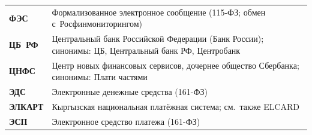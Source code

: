 \begin{longtable}{@{}p{4.5em}p{\dimexpr\linewidth-4.5em-2\tabcolsep\relax}@{}}
  \textbf{ФЭС}               & Формализованное электронное сообщение (115-ФЗ; обмен с~Росфинмониторингом)                                                                                                                                                                                                                       \\
  \textbf{ЦБ~РФ}             & Центральный банк Российской Федерации (Банк России); синонимы: ЦБ, Центральный банк РФ, Центробанк                                                                                                                                                                                                \\
  \textbf{ЦНФС}              & Центр новых финансовых сервисов, дочернее общество Сбербанка; синонимы: Плати частями                                                                                                                                                                                                            \\
  \textbf{ЭДС}               & Электронные денежные средства (161-ФЗ)                                                                                                                                                                                                                                                           \\
  \textbf{ЭЛКАРТ}            & Кыргызская национальная платёжная система; см.~также ELCARD                                                                                                                                                                                                                                      \\
  \textbf{ЭСП}               & Электронное средство платежа (161-ФЗ)                                                                                                                                                                                                                                                            \\
\end{longtable}
\endgroup
